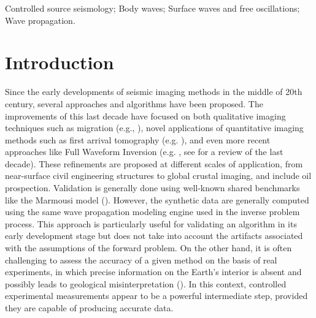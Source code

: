 \documentclass[extra,mreferee]{gji}
\begin{document}
\begin{keywords}
Controlled source seismology; Body waves; Surface waves and free oscillations; Wave propagation.
\end{keywords}

\section{Introduction}


Since the early developments of seismic imaging methods in the middle of 20th century, several approaches and algorithms have been proposed. The improvements of this last decade have focused on both qualitative imaging techniques such as migration (e.g., \cite{berkhout2012mss,guofeng2013gpu}), novel applications of quantitative imaging methods such as first arrival tomography (e.g. \cite{bohm2015cws}), and even more recent approaches like Full Waveform Inversion (e.g. \cite{perez2014awi}, see \cite{virieux2009fwi} for a review of the last decade). These refinements are proposed at different scales of application, from near-surface civil engineering structures to global crustal imaging, and include oil prospection. Validation is generally done using well-known shared benchmarks like the Marmousi model (\cite{martin2006marmousi2}). However, the synthetic data are generally computed using the same wave propagation modeling engine used in the inverse problem process. This approach is particularly useful for validating an algorithm in its early development stage but does not take into account the artifacts associated with the assumptions of the forward problem. On the other hand, it is often challenging to assess the accuracy of a given method on the basis of real experiments, in which precise information on the Earth's interior is absent and possibly leads to geological misinterpretation (\cite{morozov2004arf}). In this context, controlled experimental measurements appear to be a powerful intermediate step, provided they are capable of producing accurate data.
\end{document}
